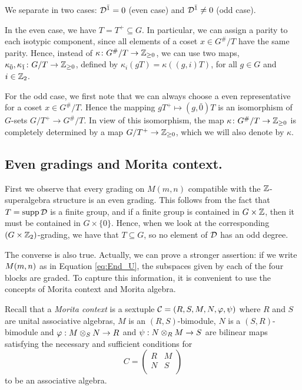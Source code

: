 We separate in two cases: $\mathcal{D}^{\bar1} = 0$ (even case) and $\mathcal{D}^{\bar1} \neq 0$ (odd case). 

In the even case, we have $T = T^+ \subseteq G$. 
In particular, we can assign a parity to each isotypic component, since all elements of a coset $x \in G^\#/T$ have the same parity. 
Hence, instead of $\kappa\colon G^\#/T \to \mathbb{Z}_{\geq 0}$, we can use two maps, $\kappa_{\bar 0}, \kappa_{\bar 1}\colon G/T \to \mathbb{Z}_{\geq 0}$, defined by $\kappa_i ( gT ) = \kappa ( (g,i)T )$, for all $g\in G$ and $i \in \mathbb{Z}_2$.

For the odd case, we first note that we can always choose a even representative for a coset $x \in G^\#/T$. 
Hence the mapping $g T^+ \mapsto (g, \bar 0) T$ is an isomorphism of $G$-sets $G/T^+ \to G^\#/T$. 
In view of this isomorphism, the map $\kappa\colon G^\#/T \to \mathbb{Z}_{\geq 0}$ is completely determined by a map $G/T^+ \to \mathbb{Z}_{\geq 0}$, which we will also denote by $\kappa$.

\subsection{Even gradings and Morita context.}\label{subsec:even-gradings}

First we observe that every grading on $M(m,n)$ compatible with the $\mathbb{Z}$-superalgebra structure is an even grading. This follows from the fact that $T=\operatorname{supp} \mathcal{D}$ is a finite group, and if a finite group is contained in $G\times \mathbb{Z}$, then it must be contained in $G\times \{0\}$. Hence, when we look at the corresponding $(G\times\mathbb{Z}_2)$-grading, we have that $T\subseteq G$, so no element of $\mathcal{D}$ has an odd degree.

The converse is also true. Actually, we can prove a stronger assertion: if we write $M(m,n)$ as in Equation \eqref{eq:End_U}, the subspaces given by each of the four blocks are graded. To capture this information, it is convenient to use the concepts of Morita context and Morita algebra.

Recall that a \emph{Morita context} is a sextuple $\mathcal{C} = (R, S, M, N, \varphi, \psi )$ where $R$ and $S$ are unital associative algebras, $M$ is an $(R,S)$-bimodule, $N$ is a $(S,R)$-bimodule and $\varphi: M\otimes_{S} N\rightarrow R$ and $\psi: N\otimes_{R} M\rightarrow S$ are bilinear maps satisfying the necessary and sufficient conditions for
\begin{equation*}
	C = \left(\begin{matrix}\label{eq:morita-algebra}
		R   &  M\\
		N   &  S\\
	\end{matrix}
	\right)
\end{equation*}
to be an associative algebra.%

